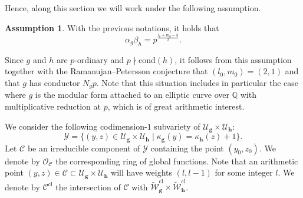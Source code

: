 \documentclass[a4paper,11pt]{amsart}
\theoremstyle{plain}
\theoremstyle{definition}
\newtheorem{ass}[theorem]{Assumption}
\theoremstyle{remark}
\newcommand{\bb}{\mathbb}
\newcommand{\cl}{\mathcal}
\newcommand{\hf}{{\mathbf{f}}}
\newcommand{\hg}{{\mathbf{g}}}
\newcommand{\hh}{{\mathbf h}}
\numberwithin{equation}{section}
\begin{document}
Hence, along this section we will work under the following assumption.

\begin{ass}
With the previous notations, it holds that \[ \alpha_g \beta_h = p^{\frac{l_0+m_0-3}{2}}. \] 
\end{ass}

Since $g$ and $h$ are $p$-ordinary and $p\nmid \mathrm{cond}(h)$, it follows from this assumption together with the Ramanujan--Petersson conjecture that $(l_0,m_0)=(2,1)$ and that $g$ has conductor $N_gp$. Note that this situation includes in particular the case where $g$ is the modular form attached to an elliptic curve over $\bb{Q}$ with multiplicative reduction at $p$, which is of great arithmetic interest.




We consider the following codimension-$1$ subvariety of $\cl{U}_{\hg}\times \cl{U}_{\hh}$:
\[
\cl{Y}=\lbrace (y,z)\in \cl{U}_{\hg}\times\cl{U}_{\hh}\;\vert\; \kappa_{\hg}(y)=\kappa_{\hh}(z)+1\rbrace.
\]
Let $\cl{C}$ be an irreducible component of $\cl{Y}$ containing the point $(y_0,z_0)$. We denote by $\cl{O}_{\cl{C}}$ the corresponding ring of global functions. Note that an arithmetic point $(y,z)\in \cl{C}\subset \cl{U}_\hg\times\cl{U}_\hh$ will have weights $(l,l-1)$ for some integer $l$. We denote by $\cl{C}^{\mathrm{cl}}$ the intersection of $\cl{C}$ with $\tilde{\cl{W}}_{\hg}^{\mathrm{cl}}\times \tilde{\cl{W}}_{\hh}^{\mathrm{cl}}$.
\end{document}
